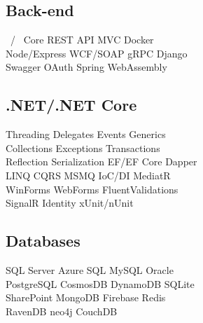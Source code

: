 \documentclass[letterpaper]{cv_12} %
\begin{document}
\begin{minipage}[t]{0.39\textwidth}
    \sectionspace%

    \subsection{Back-end}

    \dotnet\ / \dotnet\ Core \textbullet{} REST API \textbullet{} MVC
    \textbullet{} Docker\\
    Node/Express \textbullet{} WCF/SOAP \textbullet{} gRPC \textbullet{}
    Django\\
    Swagger \textbullet{} OAuth \textbullet{} Spring \textbullet{}
    WebAssembly

    \sectionspace%

    \subsection{.NET/.NET Core}

    Threading \textbullet{} Delegates \textbullet{} Events \textbullet{}
    Generics\\
    Collections \textbullet{} Exceptions \textbullet{} Transactions\\
    Reflection \textbullet{} Serialization \textbullet{} EF/EF Core
    \textbullet{} Dapper\\
    LINQ \textbullet{} CQRS \textbullet{} MSMQ \textbullet{} IoC/DI
    \textbullet{} MediatR\\
    WinForms \textbullet{} WebForms \textbullet{} FluentValidations\\
    SignalR \textbullet{} Identity \textbullet{} xUnit/nUnit

    \sectionspace%

    \subsection{Databases}

    SQL Server \textbullet{} Azure SQL \textbullet{} MySQL \textbullet{}
    Oracle\\
    PostgreSQL \textbullet{} CosmosDB \textbullet{} DynamoDB \textbullet{}
    SQLite\\
    SharePoint \textbullet{} MongoDB \textbullet{} Firebase \textbullet{} 
    Redis\\
    RavenDB \textbullet{} neo4j \textbullet{} CouchDB

    \sectionspace%


\end{minipage}
\end{document}
